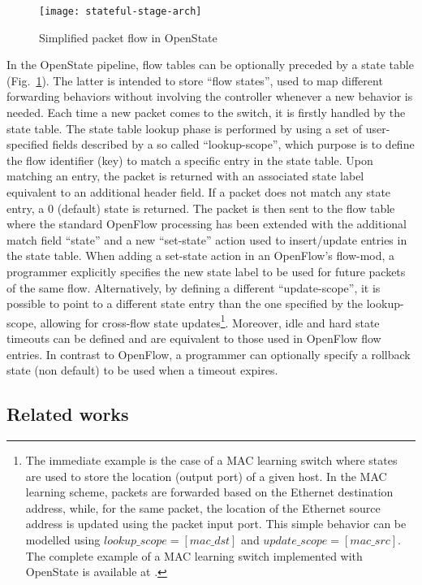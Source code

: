 \documentclass[10pt,conference]{IEEEtran}
\begin{document}
\begin{figure}
  \centering
  \texttt{[image: stateful-stage-arch]}
  \caption{Simplified packet flow in OpenState}
  \label{fig:os-stateful-stage}
  \vspace{-5mm}
\end{figure}

In the OpenState pipeline, flow tables can be optionally preceded by a state table (Fig.~\ref{fig:os-stateful-stage}). The latter is intended to store ``flow states'', used to map different forwarding behaviors without involving the controller whenever a new behavior is needed. Each time a new packet comes to the switch, it is firstly handled by the state table. The state table lookup phase is performed by using a set of user-specified fields described by a so called ``lookup-scope'', which purpose is to define the flow identifier (key) to match a specific entry in the state table. Upon matching an entry, the packet is returned with an associated state label equivalent to an additional header field. If a packet does not match any state entry, a 0 (default) state is returned. The packet is then sent to the flow table where the standard OpenFlow processing has been extended with the additional match field ``state'' and a new ``set-state'' action used to insert/update entries in the state table. When adding a set-state action in an OpenFlow's flow-mod, a programmer explicitly specifies the new state label to be used for future packets of the same flow. Alternatively, by defining a different ``update-scope'', it is possible to point to a different state entry than the one specified by the lookup-scope, allowing for cross-flow state updates\footnote{The immediate example is the case of a MAC learning switch where states are used to store the location (output port) of a given host. In the MAC learning scheme, packets are forwarded based on the Ethernet destination address, while, for the same packet, the location of the Ethernet source address is updated using the packet input port. This simple behavior can be modelled using $lookup\_scope=[mac\_dst]$ and $update\_scope=[mac\_src]$. The complete example of a MAC learning switch implemented with OpenState is available at \cite{bianchi14}.}. Moreover, idle and hard state timeouts can be defined and are equivalent to those used in OpenFlow flow entries. In contrast to OpenFlow, a programmer can optionally specify a rollback state (non default) to be used when a timeout expires.

\subsection*{Related works}
\end{document}
